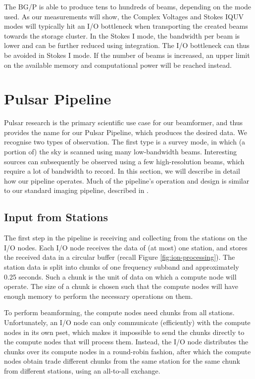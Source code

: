 \documentclass{llncs}
\begin{document}
The BG/P is able to produce tens to hundreds of beams, depending on the mode used. As our measurements will show, the Complex Voltages and Stokes IQUV modes will typically hit an I/O bottleneck when transporting the created beams towards the storage cluster. In the Stokes I mode, the bandwidth per beam is lower and can be further reduced using integration. The I/O bottleneck can thus be avoided in Stokes I mode. If the number of beams is increased, an upper limit on the available memory and computational power will be reached instead.

\section{Pulsar Pipeline}

Pulsar research is the primary scientific use case for our beamformer, and thus provides the name for our Pulsar Pipeline, which produces the desired data. We recognise two types of observation. The first type is a survey mode, in which (a portion of) the sky is scanned using many low-bandwidth beams. Interesting sources can subsequently be observed using a few high-resolution beams, which require a lot of bandwidth to record. In this section, we will describe in detail how our pipeline operates. Much of the pipeline's operation and design is similar to our standard imaging pipeline, described in \cite{Romein:10a}.

\subsection{Input from Stations}

The first step in the pipeline is receiving and collecting from the stations on the I/O nodes. Each I/O node receives the data of (at most) one station, and stores the received data in a circular buffer (recall Figure \ref{fig:ion-processing}). The station data is split into chunks of one frequency subband and approximately 0.25 seconds. Such a chunk is the unit of data on which a compute node will operate. The size of a chunk is chosen such that the compute nodes will have enough memory to perform the necessary operations on them.

To perform beamforming, the compute nodes need chunks from all stations. Unfortunately, an I/O node can only communicate (efficiently) with the compute nodes in its own pset, which makes it impossible to send the chunks directly to the compute nodes that will process them. Instead, the I/O node distributes the chunks over its compute nodes in a round-robin fashion, after which the compute nodes obtain trade different chunks from the same station for the same chunk from different stations, using an all-to-all exchange.
\end{document}
